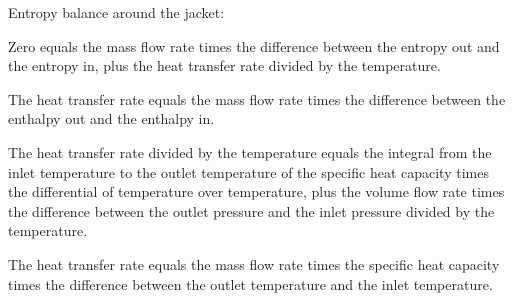 Entropy balance around the jacket:

Zero equals the mass flow rate times the difference between the entropy out and the entropy in, plus the heat transfer rate divided by the temperature.

The heat transfer rate equals the mass flow rate times the difference between the enthalpy out and the enthalpy in.

The heat transfer rate divided by the temperature equals the integral from the inlet temperature to the outlet temperature of the specific heat capacity times the differential of temperature over temperature, plus the volume flow rate times the difference between the outlet pressure and the inlet pressure divided by the temperature.

The heat transfer rate equals the mass flow rate times the specific heat capacity times the difference between the outlet temperature and the inlet temperature.